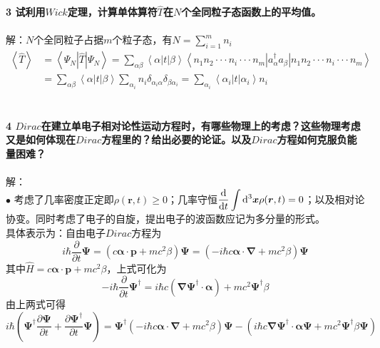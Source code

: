 \documentclass[12pt]{article}
\numberwithin{equation}{section}	 %
\begin{document}
\begin{spacing}{1.5}
\textbf{3 \quad 试利用$Wick$定理，计算单体算符$\hat{T}$在$N$个全同粒子态函数上的平均值。}\\
~\\
解：$N$个全同粒子占据$m$个粒子态，有$\displaystyle N=\sum_{i=1}^{m}n_{i}$
\begin{equation}
\begin{aligned}
\left<\hat{T}\right> &= \left<\Psi_{N}\left|\hat{T}\right|\Psi_{N}\right> = \sum_{\alpha\beta}\left<\alpha\left|t\right|\beta\right> \left<n_{1}n_{2}\cdot\cdot\cdot n_{i}\cdot\cdot\cdot n_{m}\left| a_{\alpha}^{\dagger} a_{\beta} \right|n_{1}n_{2}\cdot\cdot\cdot n_{i}\cdot\cdot\cdot n_{m}\right> \\
&= \sum_{\alpha\beta}\left<\alpha\left|t\right|\beta\right> \sum_{\alpha_{i}}n_{i}\delta_{\alpha_{i}\alpha}\delta_{\beta\alpha_{i}} = \sum_{\alpha_{i}} \left<\alpha_{i}\left|t\right|\alpha_{i}\right> n_{i}
\end{aligned}
\end{equation}
~\\
~\\
\textbf{4 \quad $Dirac$在建立单电子相对论性运动方程时，有哪些物理上的考虑？这些物理考虑又是如何体现在$Dirac$方程里的？给出必要的论证。以及$Dirac$方程如何克服负能量困难？}\\
~\\
解：\\
$\bullet$ 考虑了几率密度正定即$\rho(\bm{r},t) \ge 0$；几率守恒$\displaystyle \frac{\mathop{}\!\mathrm{d}}{\mathop{}\!\mathrm{d} t}\int\mathop{}\!\mathrm{d}^{3}\bm{x}\rho(\bm{r},t) = 0$；以及相对论协变。同时考虑了电子的自旋，提出电子的波函数应记为多分量的形式。\\
具体表示为：自由电子$Dirac$方程为
\begin{equation}
i\hbar\frac{\partial}{\partial t}\bm\Psi = \left(c\bm{\alpha \cdot p} +mc^{2}\beta\right)\bm\Psi = \left(-i\hbar c\bm{\alpha \cdot \nabla} +mc^{2}\beta\right)\bm\Psi
\end{equation}
其中$\hat{H} = c\bm{\alpha \cdot p} +mc^{2}\beta$，上式可化为
\begin{equation}
-i\hbar\frac{\partial}{\partial t}\bm\Psi^{\dagger} = i\hbar c\left(\bm{\nabla\Psi^{\dagger} \cdot \alpha} \right) +mc^{2}\bm\Psi^{\dagger}\beta
\end{equation}
由上两式可得
\begin{equation}
i\hbar\left( \bm\Psi^{\dagger}\frac{\partial\bm\Psi}{\partial t} + \frac{\partial\bm\Psi^{\dagger}}{\partial t}\bm\Psi \right) = \bm\Psi^{\dagger}\left(-i\hbar c\bm{\alpha \cdot \nabla} +mc^{2}\beta\right)\bm\Psi - \left( i\hbar c\bm{\nabla\Psi^{\dagger} \cdot \alpha}\bm\Psi  +mc^{2}\bm\Psi^{\dagger}\beta\bm\Psi \right)

\end{equation}
\end{spacing}
\end{document}
